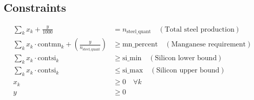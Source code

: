 \documentclass{article}
\begin{document}
\subsection*{Constraints}
\begin{align}
    \sum_{k} x_k + \frac{y}{1000} &= n_{\text{steel\_quant}} \quad (\text{Total steel production}) \\
    \sum_{k} x_k \cdot \text{contmn}_k + \left( \frac{y}{n_{\text{steel\_quant}}} \right) &\geq \text{mn\_percent} \quad (\text{Manganese requirement}) \\
    \sum_{k} x_k \cdot \text{contsi}_k &\geq \text{si\_min} \quad (\text{Silicon lower bound}) \\
    \sum_{k} x_k \cdot \text{contsi}_k &\leq \text{si\_max} \quad (\text{Silicon upper bound}) \\
    x_k &\geq 0 \quad \forall k \\
    y &\geq 0
\end{align}
\end{document}
